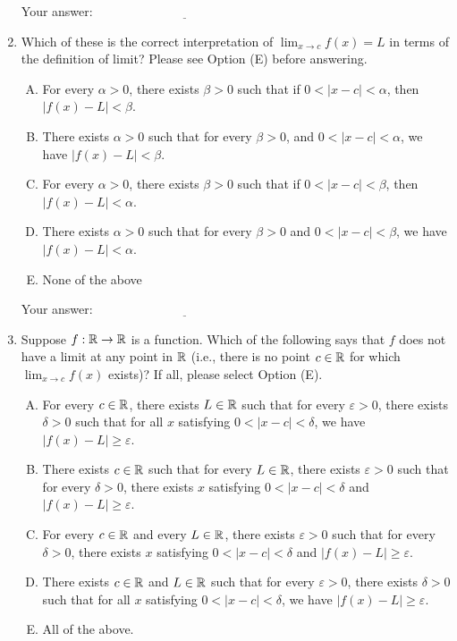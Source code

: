\documentclass[10pt]{amsart}
\begin{document}
\begin{enumerate}
  \vspace{0.1in}
  Your answer: $\underline{\qquad\qquad\qquad\qquad\qquad\qquad\qquad}$
  \vspace{0.1in}

\item Which of these is the correct interpretation of $\displaystyle
  \lim_{x \to c} f(x) = L$ in terms of the definition of limit? Please
  see Option (E) before answering.

  \begin{enumerate}[(A)]
  \item For every $\alpha > 0$, there exists $\beta > 0$ such that if
    $0 < |x - c| < \alpha$, then $|f(x) - L| < \beta$.
  \item There exists $\alpha > 0$ such that for every $\beta > 0$, and
    $0 < |x - c| < \alpha$, we have $|f(x) - L| < \beta$.
  \item For every $\alpha > 0$, there exists $\beta > 0$ such that if
    $0 < |x - c| < \beta$, then $|f(x) - L| < \alpha$.
  \item There exists $\alpha > 0$ such that for every $\beta > 0$ and
    $0 < |x - c| < \beta$, we have $|f(x) - L| < \alpha$.
  \item None of the above
  \end{enumerate}

  \vspace{0.1in}
  Your answer: $\underline{\qquad\qquad\qquad\qquad\qquad\qquad\qquad}$
  \vspace{0.5in}

\item Suppose $f:\mathbb{R} \to \mathbb{R}$ is a function. Which of the following says
  that $f$ does not have a limit at any point in $\mathbb{R}$ (i.e., there is
  no point $c \in \mathbb{R}$ for which $\displaystyle \lim_{x \to c} f(x)$
  exists)? If all, please select Option (E).

  \begin{enumerate}[(A)]
  \item For every $c \in \mathbb{R}$, there exists $L \in \mathbb{R}$ such that for
    every $\varepsilon > 0$, there exists $\delta > 0$ such that for all
    $x$ satisfying $0 < |x - c| < \delta$, we have $|f(x) - L| \ge
    \varepsilon$.
  \item There exists $c \in \mathbb{R}$ such that for every $L \in \mathbb{R}$, there
    exists $\varepsilon > 0$ such that for every $\delta > 0$, there exists
    $x$ satisfying $0 < |x - c| < \delta$ and $|f(x) - L| \ge \varepsilon$.
  \item For every $c \in \mathbb{R}$ and every $L \in \mathbb{R}$, there exists
    $\varepsilon > 0$ such that for every $\delta > 0$, there exists $x$
    satisfying $0 < |x - c| < \delta$ and $|f(x) - L| \ge \varepsilon$.
  \item There exists $c \in \mathbb{R}$ and $L \in \mathbb{R}$ such that for
    every $\varepsilon > 0$, there exists $\delta > 0$ such that for all
    $x$ satisfying $0 < |x - c| < \delta$, we have $|f(x) - L| \ge
    \varepsilon$.
  \item All of the above.
  \end{enumerate}


\end{enumerate}
\end{document}

